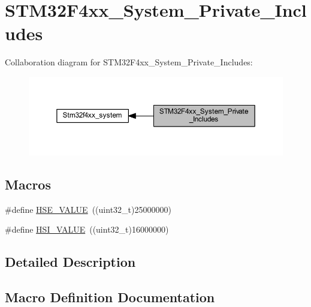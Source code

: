 \hypertarget{group___s_t_m32_f4xx___system___private___includes}{}\section{S\+T\+M32\+F4xx\+\_\+\+System\+\_\+\+Private\+\_\+\+Includes}
\label{group___s_t_m32_f4xx___system___private___includes}
Collaboration diagram for S\+T\+M32\+F4xx\+\_\+\+System\+\_\+\+Private\+\_\+\+Includes\+:
\nopagebreak
\begin{figure}[H]
\begin{center}
\leavevmode
\includegraphics[width=350pt]{group___s_t_m32_f4xx___system___private___includes}
\end{center}
\end{figure}
\subsection*{Macros}
\begin{DoxyCompactItemize}
\item 
\#define \mbox{\hyperlink{group___s_t_m32_f4xx___system___private___includes_gaeafcff4f57440c60e64812dddd13e7cb}{H\+S\+E\+\_\+\+V\+A\+L\+UE}}~((uint32\+\_\+t)25000000)
\item 
\#define \mbox{\hyperlink{group___s_t_m32_f4xx___system___private___includes_gaaa8c76e274d0f6dd2cefb5d0b17fbc37}{H\+S\+I\+\_\+\+V\+A\+L\+UE}}~((uint32\+\_\+t)16000000)
\end{DoxyCompactItemize}


\subsection{Detailed Description}


\subsection{Macro Definition Documentation}
\mbox{\label{group___s_t_m32_f4xx___system___private___includes_gaeafcff4f57440c60e64812dddd13e7cb}} 
